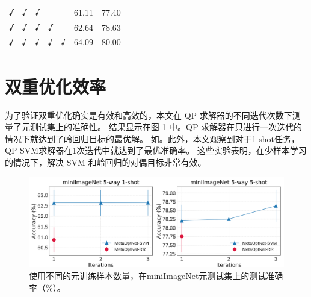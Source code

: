 \begin{table}[htbp]
\begin{tabular}{ccccc|cc}
    \textbf{√}                                                   & \textbf{√}                                                      & \textbf{√}                                                    &                                                               &                                                                & 61.11           & 77.40           \\
    \textbf{√}                                                   & \textbf{√}                                                      & \textbf{√}                                                    & \textbf{√}                                                    &                                                                & 62.64           & 78.63           \\
    \textbf{√}                                                   & \textbf{√}                                                      & \textbf{√}                                                    & \textbf{√}                                                    & \textbf{√}                                                     & 64.09           & 80.00           \\ \hline
    \end{tabular}
 
    \label{table:4}
    \end{table}

\section{双重优化效率}

为了验证双重优化确实是有效和高效的，本文在 QP 求解器的不同迭代次数下测量了元测试集上的准确性。
结果显示在图 \ref{fig:3} 中。QP 求解器在只进行一次迭代的情况下就达到了岭回归目标的最优解。
如。此外，本文观察到对于1-shot任务，
QP SVM求解器在1次迭代中就达到了最优准确率。
这些实验表明，在少样本学习的情况下，解决 SVM 和岭回归的对偶目标非常有效。\\

\begin{figure}[htbp]
    \centering
    \includegraphics[width=.6\linewidth]{figure/f3.png}
    \caption{使用不同的元训练样本数量，在miniImageNet元测试集上的测试准确率（\%）。}
    \label{fig:3}
\end{figure}

